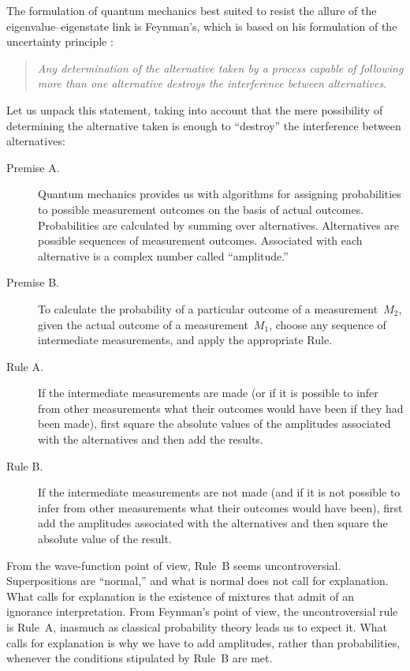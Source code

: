 \documentclass[12pt]{article}
\newcommand{\bq}{\begin{quote}}
\newcommand{\eq}{\end{quote}}
\begin{document}
The formulation of quantum mechanics best suited to resist the allure of the eigenvalue--eigenstate link is Feynman's, which is based on his formulation of the uncertainty principle \cite{Feynman1948,FHS}:
\bq
\emph{Any determination of the alternative taken by a process capable of following more than one alternative destroys the interference between alternatives.}
\eq
Let us unpack this statement, taking into account that the mere possibility of determining the alternative taken is enough to ``destroy'' the interference between alternatives:
\begin{description}
\item[{Premise A}.]Quantum mechanics provides us with algorithms for assigning probabilities to possible measurement outcomes on the basis of actual outcomes. Probabilities are calculated by summing over alternatives. Alternatives are possible sequences of measurement outcomes. Associated with each alternative is a complex number called ``amplitude.''
\item[{Premise B}.]To calculate the probability of a particular outcome of a measurement~$M_2$, given the actual outcome of a  measurement~$M_1$, choose any sequence of intermediate measurements, and apply the appropriate Rule.
\item[{Rule A}.]If the intermediate measurements are made (or if it is possible to infer from other measurements what their outcomes would have been if they had been made), first square the absolute values of the amplitudes associated with the alternatives and then add the results.
\item[{Rule B}.]If the intermediate measurements are not made (and if it is not possible to infer from other measurements what their outcomes would have been), first add the amplitudes associated with the alternatives and then square the absolute value of the result.
\end{description}
From the wave-function point of view, Rule~B seems uncontroversial. Superpositions are ``normal,'' and what is normal does not call for explanation. What calls for explanation is the existence of mixtures that admit of an ignorance interpretation. From Feynman's point of view, the uncontroversial rule is Rule~A, inasmuch as classical probability theory leads us to expect it. What calls for explanation is why we have to add amplitudes, rather than probabilities, whenever the conditions stipulated by Rule~B are met.
\end{document}
